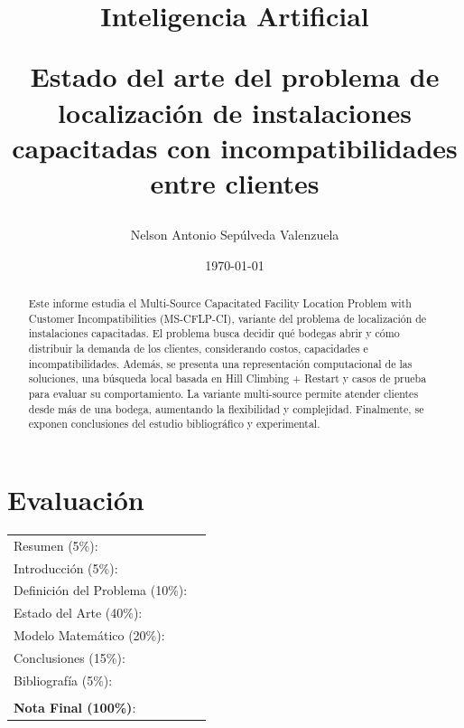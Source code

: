 \documentclass[letter, 10pt]{article}
\begin{document}
\title{Inteligencia Artificial \\ \begin{Large}Estado del arte del problema de localización de instalaciones capacitadas con incompatibilidades entre clientes
\end{Large}}
\author{Nelson Antonio Sepúlveda Valenzuela}
\date{\today}
\maketitle


\section*{Evaluaci\'on}

\begin{tabular}{ll}
Resumen (5\%): & \underline{\hspace{2cm}} \\
Introducci\'on (5\%):  & \underline{\hspace{2cm}} \\
Definici\'on del Problema (10\%):  & \underline{\hspace{2cm}} \\
Estado del Arte (40\%):  & \underline{\hspace{2cm}} \\
Modelo Matem\'atico (20\%): &  \underline{\hspace{2cm}}\\
Conclusiones (15\%): &  \underline{\hspace{2cm}}\\
Bibliograf\'ia (5\%): & \underline{\hspace{2cm}}\\
 &  \\
\textbf{Nota Final (100\%)}:   & \underline{\hspace{2cm}}
\end{tabular}
\vspace{2cm}

\begin{abstract}
\noindent Este informe estudia el Multi-Source Capacitated Facility Location Problem with Customer Incompatibilities (MS-CFLP-CI), variante del problema de localización de instalaciones capacitadas. El problema busca decidir qué bodegas abrir y cómo distribuir la demanda de los clientes, considerando costos, capacidades e incompatibilidades. Además, se presenta una representación computacional de las soluciones, una búsqueda local basada en Hill Climbing + Restart y casos de prueba para evaluar su comportamiento. La variante multi-source permite atender clientes desde más de una bodega, aumentando la flexibilidad y complejidad. Finalmente, se exponen conclusiones del estudio bibliográfico y experimental.
\end{abstract}
\end{document}
